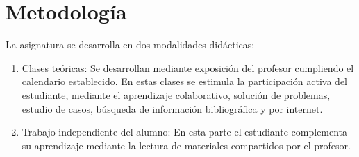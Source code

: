 \section{Metodología}


La asignatura se desarrolla en dos modalidades didácticas:

\begin{enumerate}[label=\arabic*., font=\bfseries, nosep]
      \item

            Clases teóricas: Se desarrollan mediante exposición del
            profesor cumpliendo el calendario establecido.
            En estas clases se estimula la participación activa del
            estudiante, mediante el aprendizaje colaborativo,
            solución de problemas, estudio de casos, búsqueda de
            información bibliográfica y por internet.

      \item

            Trabajo independiente del alumno:
            En esta parte el estudiante complementa su aprendizaje
            mediante la lectura de materiales compartidos por el
            profesor.
\end{enumerate}




